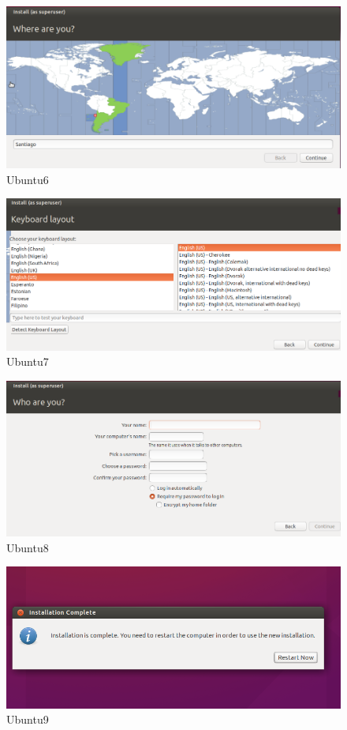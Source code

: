 \begin{figure}[!ht]
	\centering
	\includegraphics[scale=0.5]{input/images/ub6.png}                   
	\caption{Ubuntu6}
	\hspace{-1.5em}
\end{figure}
\begin{figure}[!ht]
	\centering
	\includegraphics[scale=0.5]{input/images/ub7.png}                   
	\caption{Ubuntu7}
	\hspace{-1.5em}
\end{figure}
\begin{figure}[!ht]
	\centering
	\includegraphics[scale=0.5]{input/images/ub8.png}                   
	\caption{Ubuntu8}
	\hspace{-1.5em}
\end{figure}
\begin{figure}[!ht]
	\centering
	\includegraphics[scale=0.5]{input/images/ub9.png}                   
	\caption{Ubuntu9}
	\hspace{-1.5em}
\end{figure}